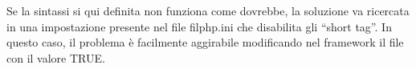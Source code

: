 Se la sintassi si qui definita non funziona come dovrebbe, la soluzione va ricercata in una impostazione presente nel file fil{php.ini} che disabilita gli ``short tag''. In questo caso, il problema è facilmente aggirabile modificando nel framework il file  con il valore TRUE.

